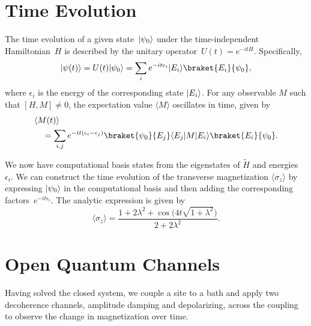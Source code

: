 \documentclass[12pt, twocolumn]{article}
\newcommand*{\eu}{e}
\newcommand*{\iu}{i}
\DeclarePairedDelimiter{\bra}{\langle}{\rvert}
\DeclarePairedDelimiter{\ket}{\lvert}{\rangle}
\begin{document}
  \section{Time Evolution}
  The time evolution of a given state~\( \ket{\psi_{0}} \) under the time-independent Hamiltonian~\( H \) is described by the unitary operator~\( U(t) = \eu^{-\iu t H} \). Specifically,
  \begin{equation}
    \ket{\psi(t)}
      = U(t) \ket{\psi_{0}}
      = \sum_{i} \eu^{-\iu t \epsilon_{i}} \ket{E_{i}} \braket{E_{i}}{\psi_{0}},
  \end{equation}
  where \( \epsilon_{i} \) is the energy of the corresponding state \( \ket{E_{i}} \). For any observable \( M \) such that \( [H, M] \neq 0 \), the expectation value \( \langle M \rangle \) oscillates in time, given by
  \begin{align}
    \MoveEqLeft[1] \langle M(t) \rangle \notag \\
      &= \sum_{i, j} \eu^{-\iu t (\epsilon_{i} - \epsilon_{j})}
         \braket{\psi_{0}}{E_{j}} \bra{E_{j}} M \ket{E_{i}}
         \braket{E_{i}}{\psi_{0}}.
  \end{align}

  We now have computational basis states from the eigenstates of \( \tilde{H} \) and energies~\( \epsilon_{i} \). We can construct the time evolution of the transverse magnetization \( \langle \sigma_{z} \rangle \) by expressing \( \ket{\psi_{0}} \) in the computational basis and then adding the corresponding factors~\( \eu^{-\iu t \epsilon_{i}} \). The analytic expression is given by
  \begin{equation}
    \langle \sigma_{z} \rangle
      = \frac{1 + 2 \lambda^{2} + \cos \bigl( 4 t \sqrt{1 + \lambda^{2}} \bigr)}
             {2 + 2 \lambda^{2}}.
  \end{equation}

  \section{Open Quantum Channels}
  Having solved the closed system, we couple a site to a bath and apply two decoherence channels, amplitude damping and depolarizing, across the coupling to observe the change in magnetization over time.
\end{document}
